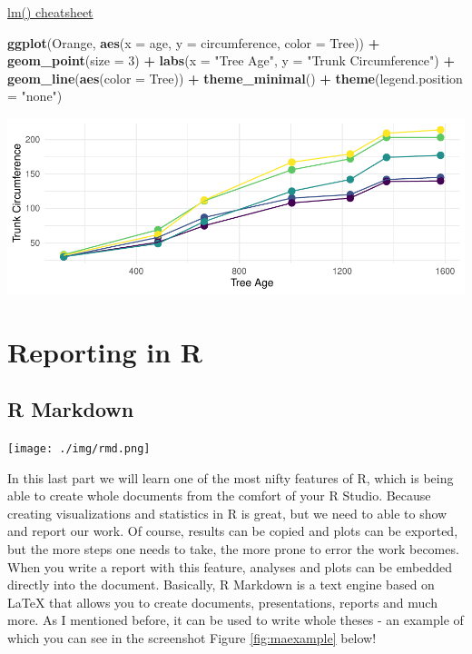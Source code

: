 \documentclass[
]{book}
\newenvironment{Shaded}{\begin{snugshade}}{\end{snugshade}}
\newcommand{\AttributeTok}[1]{\textcolor[rgb]{0.13,0.29,0.53}{#1}}
\newcommand{\DecValTok}[1]{\textcolor[rgb]{0.00,0.00,0.81}{#1}}
\newcommand{\FunctionTok}[1]{\textcolor[rgb]{0.13,0.29,0.53}{\textbf{#1}}}
\newcommand{\NormalTok}[1]{#1}
\newcommand{\SpecialCharTok}[1]{\textcolor[rgb]{0.81,0.36,0.00}{\textbf{#1}}}
\newcommand{\StringTok}[1]{\textcolor[rgb]{0.31,0.60,0.02}{#1}}
\begin{document}
\href{https://www.codecademy.com/learn/learn-linear-regression-in-r/modules/linear-regression-in-r/cheatsheet/}{lm() cheatsheet}

\begin{Shaded}
\begin{Highlighting}[]
\FunctionTok{ggplot}\NormalTok{(Orange, }\FunctionTok{aes}\NormalTok{(}\AttributeTok{x =}\NormalTok{ age, }\AttributeTok{y =}\NormalTok{ circumference, }\AttributeTok{color =}\NormalTok{ Tree)) }\SpecialCharTok{+}
  \FunctionTok{geom\_point}\NormalTok{(}\AttributeTok{size =} \DecValTok{3}\NormalTok{) }\SpecialCharTok{+} \FunctionTok{labs}\NormalTok{(}\AttributeTok{x =} \StringTok{"Tree Age"}\NormalTok{, }\AttributeTok{y =} \StringTok{"Trunk Circumference"}\NormalTok{) }\SpecialCharTok{+}
  \FunctionTok{geom\_line}\NormalTok{(}\FunctionTok{aes}\NormalTok{(}\AttributeTok{color =}\NormalTok{ Tree)) }\SpecialCharTok{+} \FunctionTok{theme\_minimal}\NormalTok{() }\SpecialCharTok{+} \FunctionTok{theme}\NormalTok{(}\AttributeTok{legend.position =} \StringTok{"none"}\NormalTok{)}
\end{Highlighting}
\end{Shaded}

\includegraphics{_main_files/figure-html/orange-pretty-1.pdf}

\part{Reporting in R}\label{part-reporting-in-r}

\chapter{R Markdown}\label{r-markdown}

\texttt{[image: ./img/rmd.png]}

In this last part we will learn one of the most nifty features of R, which is being able to create whole documents from the comfort of your R Studio.
Because creating visualizations and statistics in R is great, but we need to able to show and report our work.
Of course, results can be copied and plots can be exported, but the more steps one needs to take, the more prone to error the work becomes. When you write a report with this feature, analyses and plots can be embedded directly into the document.
Basically, R Markdown is a text engine based on LaTeX that allows you to create documents, presentations, reports and much more.
As I mentioned before, it can be used to write whole theses - an example of which you can see in the screenshot Figure \ref{fig:maexample} below!
\end{document}
